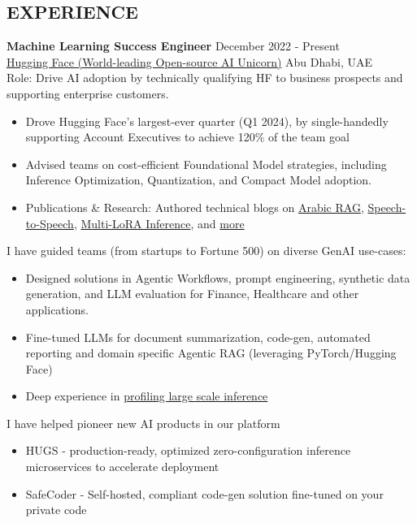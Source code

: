 \documentclass[margin, line]{res} %
\begin{document}
\begin{resume}
\section{EXPERIENCE}
{\textbf{Machine Learning Success Engineer}} \hfill December 2022 - Present\\
\href{https://www.huggingface.co/}{Hugging Face (World-leading Open-source AI Unicorn)} \hfill Abu Dhabi, UAE\\
Role: Drive AI adoption by technically qualifying HF to business prospects and supporting enterprise customers.
\begin{itemize} \itemsep -2pt
\item Drove Hugging Face’s largest-ever quarter (Q1 2024), by single-handedly supporting Account Executives to achieve 120\% of the team goal
\item Advised teams on cost-efficient Foundational Model strategies, including Inference Optimization, Quantization, and Compact Model adoption.
\item Publications \& Research: Authored technical blogs on \href{https://datavistics.github.io/posts/arabic-rag-1/}{Arabic RAG}, \href{https://huggingface.co/spaces/derek-thomas/fawkes}{Speech-to-Speech}, \href{https://huggingface.co/spaces/derek-thomas/fawkes}{Multi-LoRA Inference}, and \href{https://datavistics.github.io}{more}
\end{itemize}

I have guided teams (from startups to Fortune 500) on diverse GenAI use-cases:
\begin{itemize} \itemsep -2pt
\item Designed solutions in Agentic Workflows, prompt engineering, synthetic data generation, and LLM evaluation for Finance, Healthcare and other applications.
\item Fine-tuned LLMs for document summarization, code-gen, automated reporting and domain specific Agentic RAG (leveraging PyTorch/Hugging Face)
\item  Deep experience in \href{https://huggingface.co/blog/billion-classifications}{profiling large scale inference}
\end{itemize}

I have helped pioneer new AI products in our platform
\begin{itemize} \itemsep -2pt
\item HUGS - production-ready, optimized zero-configuration inference microservices to accelerate deployment
\item SafeCoder - Self-hosted, compliant code-gen solution fine-tuned on your private code
\end{itemize}


\end{resume}
\end{document}
